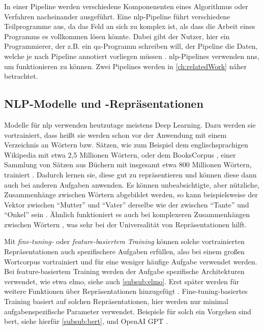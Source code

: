 In einer Pipeline werden verschiedene Komponenenten eines Algorithmus oder Verfahren nacheinander ausgeführt.
Eine \ac{nlp}-Pipeline führt verschiedene Teilprogramme aus, da das Feld an sich zu komplex ist, als dass die Arbeit eines Programms es vollkommen lösen könnte.
Dabei gibt der Nutzer, hier ein Programmierer, der z.B. ein \ac{qa}-Programm schreiben will, der Pipeline die Daten, welche je nach Pipeline annotiert vorliegen müssen \citep{curatorpipeline}.
\ac{nlp}-Pipelines verwenden \acp{nn}, um funktionieren zu können.
Zwei Pipelines werden in \cref{ch:relatedWork} näher betrachtet.

\subsection{NLP-Modelle und -Repräsentationen}

Modelle für \acl{nlp} verwenden heutzutage meistens Deep Learning.
Dazu werden sie vortrainiert, dass heißt sie werden schon vor der Anwendung mit einem Verzeichnis an Wörtern bzw. Sätzen,
wie zum Beispiel dem englischsprachigen Wikipedia mit etwa 2,5 Millionen Wörtern,
oder dem BooksCorpus \citep{bookscorpus},
einer Sammlung von Sätzen aus Büchern mit insgesamt etwa 800 Millionen Wörtern,
trainiert \citep{bert}.
Dadurch lernen sie, diese gut zu repräsentieren und können diese dann auch bei anderen Aufgaben anwenden.
Es können unbeabsichtigte, aber nützliche, Zusammenhänge zwischen Wörtern abgebildet werden,
so kann beispielsweise der Vektor zwischen \enquote{Mutter} und \enquote{Vater} derselbe wie der zwischen \enquote{Tante} und \enquote{Onkel} sein \citep{mikolov2013a}.
Ähnlich funktioniert es auch bei komplexeren Zusammenhängen zwischen Wörtern \citep{mikolov2013b}, was sehr bei der Universalität von Repräsentationen hilft.

Mit \emph{fine-tuning-} oder \emph{feature-basiertem Training} können solche vortrainierten Repräsentationen auch spezifischere Aufgaben erfüllen,
also bei einem großen Wortcorpus vortrainiert und für eine weniger häufige Aufgabe verwendet werden.
Bei feature-basiertem Training werden der Aufgabe spezifische Architekturen verwendet, wie etwa \acs{elmo}, siehe auch \cref{subsub:elmo}.
Erst später werden für weitere Funktionen über Repräsentationen hinzugefügt \citep{elmo}.
Fine-tuning-basiertes Training basiert auf solchen Repräsentationen, hier werden nur minimal aufgabenspezifische Parameter verwendet.
Beispiele für solch ein Vorgehen sind \acs{bert}, siehe hierfür \cref{subsub:bert}, und OpenAI GPT \citep{openaigpt}.

